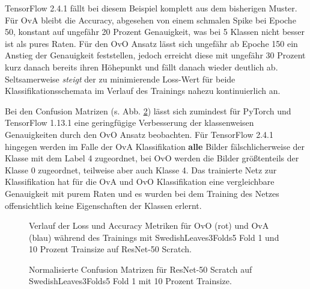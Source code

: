 TensorFlow 2.4.1 \cite{tensorflow} fällt bei diesem Beispiel komplett aus dem bisherigen Muster. Für OvA bleibt die Accuracy, abgesehen von einem schmalen Spike bei Epoche 50, konstant auf ungefähr 20 Prozent Genauigkeit, was bei 5 Klassen nicht besser ist als pures Raten. Für den OvO Ansatz lässt sich ungefähr ab Epoche 150 ein Anstieg der Genauigkeit feststellen, jedoch erreicht diese mit ungefähr 30 Prozent kurz danach bereits ihren Höhepunkt und fällt danach wieder deutlich ab.
Seltsamerweise \textit{steigt} der zu minimierende Loss-Wert für beide Klassifikationsschemata im Verlauf des Trainings nahezu kontinuierlich an.

Bei den Confusion Matrizen (s. Abb. \ref{fig:ConfusionMatrixB}) lässt sich zumindest für PyTorch \cite{pytorch} und TensorFlow 1.13.1 \cite{tensorflow} eine geringfügige Verbesserung der klassenweisen Genauigkeiten durch den OvO Ansatz beobachten. Für TensorFlow 2.4.1 \cite{tensorflow} hingegen werden im Falle der OvA Klassifikation \textbf{alle} Bilder fälschlicherweise der Klasse mit dem Label 4 zugeordnet, bei OvO werden die Bilder größtenteils der Klasse 0 zugeordnet, teilweise aber auch Klasse 4. Das trainierte Netz zur Klassifikation hat für die OvA und OvO Klassifikation eine vergleichbare Genauigkeit mit purem Raten und es wurden bei dem Training des Netzes offensichtlich keine Eigenschaften der Klassen erlernt.
\begin{figure}[H]
\begin{adjustbox}{width=1.4\textwidth, center}

\end{adjustbox}
\caption{Verlauf der Loss und Accuracy Metriken für OvO (rot) und OvA (blau) während des Trainings mit SwedishLeaves3Folds5 Fold 1 und 10 Prozent Trainsize auf ResNet-50 Scratch.}
\label{fig:TrainingsverlaufB}
\end{figure}

\begin{figure}[H]
\begin{adjustbox}{width=1.1\textwidth, center}

\end{adjustbox}
\caption{Normalisierte Confusion Matrizen für ResNet-50 Scratch auf SwedishLeaves3Folds5 Fold 1 mit 10 Prozent Trainsize.}
\label{fig:ConfusionMatrixB}
\end{figure}

